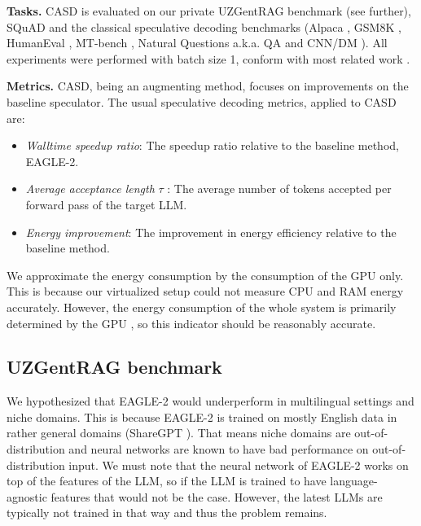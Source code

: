 \textbf{Tasks.} CASD is evaluated on our private UZGentRAG benchmark (see further), SQuAD \cite{rajpurkar2016squad} and the classical speculative decoding benchmarks (Alpaca \cite{alpaca}, GSM8K \cite{cobbe2021gsm8k}, HumanEval \cite{chen2021evaluating}, MT-bench \cite{zheng2023judging}, Natural Questions a.k.a. QA \cite{kwiatkowski2019natural} and CNN/DM \cite{nallapati2016abstractive}). All experiments were performed with batch size 1, conform with most related work \cite{kim2023speculative, leviathan2023fast, li2024eagle, zhou2023distillspec}.

\textbf{Metrics.} CASD, being an augmenting method, focuses on improvements on the baseline speculator. The usual speculative decoding metrics, applied to CASD are:
\begin{itemize}
  \item \emph{Walltime speedup ratio}: The speedup ratio relative to the baseline method, EAGLE-2.
  \item \emph{Average acceptance length} $\tau$ : The average number of tokens accepted per forward pass of the target LLM.
  \item \emph{Energy improvement}: The improvement in energy efficiency relative to the baseline method.
\end{itemize}

We approximate the energy consumption by the consumption of the GPU only. This is because our virtualized setup could not measure CPU and RAM energy accurately. However, the energy consumption of the whole system is primarily determined by the GPU \cite{li2024unseen}, so this indicator should be reasonably accurate.

\subsection{UZGentRAG benchmark}
We hypothesized that EAGLE-2 would underperform in multilingual settings and niche domains. This is because EAGLE-2 is trained on mostly English data in rather general domains (ShareGPT \cite{shareGPT}). That means niche domains are out-of-distribution and neural networks are known to have bad performance on out-of-distribution input. We must note that the neural network of EAGLE-2 works on top of the features of the LLM, so if the LLM is trained to have language-agnostic features that would not be the case. However, the latest LLMs are typically not trained in that way and thus the problem remains.

